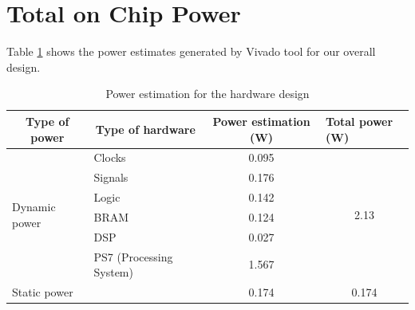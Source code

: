 \documentclass[12pt,a4paper]{report}
\begin{document}
\section{Total on Chip Power}
Table \ref{power} shows the power estimates generated by Vivado tool for our overall design.
\begin{table}[H]
\centering
\caption{Power estimation for the hardware design}
\label{power}
\begin{tabular}{|l|l|c|c|}
\hline
\multicolumn{1}{|c|}{\textbf{Type of power}} & \multicolumn{1}{c|}{\textbf{Type of hardware}} & \textbf{Power estimation (W)} & \multicolumn{1}{l|}{\textbf{Total power (W)}} \\ \hline
\multirow{6}{*}{Dynamic power}               & Clocks                                         & 0.095                         & \multirow{6}{*}{2.13}                         \\ \cline{2-3}
                                             & Signals                                        & 0.176                         &                                               \\ \cline{2-3}
                                             & Logic                                          & 0.142                         &                                               \\ \cline{2-3}
                                             & BRAM                                           & 0.124                         &                                               \\ \cline{2-3}
                                             & DSP                                            & 0.027                         &                                               \\ \cline{2-3}
                                             & PS7 (Processing System)                        & 1.567                         &                                               \\ \hline
\multicolumn{2}{|l|}{Static power}                                                            & 0.174                         & 0.174                                         \\ \hline
\end{tabular}
\end{table}
\end{document}
